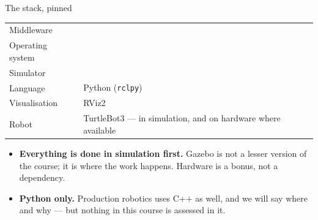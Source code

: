 \documentclass[aspectratio=169]{beamer}
\begin{document}
\begin{frame}{The stack, pinned}
  \begin{center}
  \begin{tabular}{@{}ll@{}}
    \toprule
    Middleware   & \rosver{} \\
    Operating system & \ubuntuver{} \\
    Simulator    & \gazebover{} \\
    Language     & Python \pyver{} (\texttt{rclpy}) \\
    Visualisation & RViz2 \\
    Robot        & TurtleBot3 --- in simulation, and on hardware where available \\
    \bottomrule
  \end{tabular}
  \end{center}

  \vspace{0.9em}
  \begin{itemize}\small
    \item \textbf{Everything is done in simulation first.} Gazebo is not a lesser version of
          the course; it is where the work happens. Hardware is a bonus, not a dependency.
    \item \textbf{Python only.} Production robotics uses C++ as well, and we will say where
          and why --- but nothing in this course is assessed in it.
  \end{itemize}
\end{frame}
\end{document}
